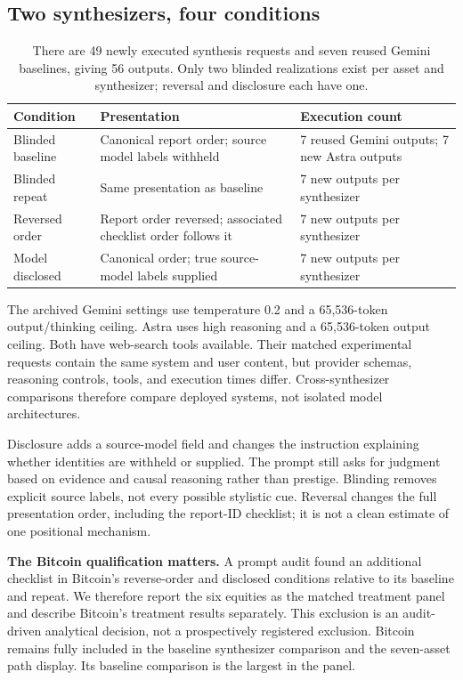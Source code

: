 \documentclass[11pt]{article}
\begin{document}
\subsection{Two synthesizers, four conditions}
\begin{table}[ht]
\centering\small
\begin{tabularx}{\linewidth}{@{}lXX@{}}
\toprule
Condition & Presentation & Execution count \\
\midrule
Blinded baseline & Canonical report order; source model labels withheld & 7 reused Gemini outputs; 7 new Astra outputs \\
Blinded repeat & Same presentation as baseline & 7 new outputs per synthesizer \\
Reversed order & Report order reversed; associated checklist order follows it & 7 new outputs per synthesizer \\
Model disclosed & Canonical order; true source-model labels supplied & 7 new outputs per synthesizer \\
\bottomrule
\end{tabularx}
\caption{There are 49 newly executed synthesis requests and seven reused Gemini baselines, giving 56 outputs. Only two blinded realizations exist per asset and synthesizer; reversal and disclosure each have one.}
\label{tab:design}
\end{table}

The archived Gemini settings use temperature 0.2 and a 65,536-token output/thinking ceiling. Astra uses high reasoning and a 65,536-token output ceiling. Both have web-search tools available. Their matched experimental requests contain the same system and user content, but provider schemas, reasoning controls, tools, and execution times differ. Cross-synthesizer comparisons therefore compare deployed systems, not isolated model architectures.

Disclosure adds a source-model field and changes the instruction explaining whether identities are withheld or supplied. The prompt still asks for judgment based on evidence and causal reasoning rather than prestige. Blinding removes explicit source labels, not every possible stylistic cue. Reversal changes the full presentation order, including the report-ID checklist; it is not a clean estimate of one positional mechanism.

\textbf{The Bitcoin qualification matters.} A prompt audit found an additional checklist in Bitcoin's reverse-order and disclosed conditions relative to its baseline and repeat. We therefore report the six equities as the matched treatment panel and describe Bitcoin's treatment results separately. This exclusion is an audit-driven analytical decision, not a prospectively registered exclusion. Bitcoin remains fully included in the baseline synthesizer comparison and the seven-asset path display. Its baseline comparison is the largest in the panel.
\end{document}
